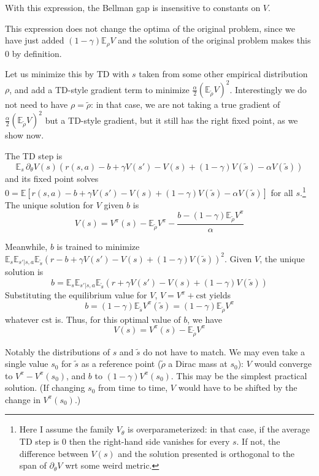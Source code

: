 \documentclass[11pt]{article}
\newcommand{\E}{\mathbb{E}}
\begin{document}
With this expression, the Bellman gap is insensitive to constants on $V$.

This expression does not change the optima of the original
problem, since we have just added $(1-\gamma)\E_\rho V$ and the solution
of the original problem makes this $0$ by definition.

Let us minimize this by TD with $s$ taken from some other empirical
distribution $\rho$, and add a TD-style gradient term to minimize
$\frac{\alpha}{2} (\E_{\tilde \rho} V)^2$. Interestingly we do not need
to have $\rho=\tilde \rho$: in that case, we are not taking a true
gradient of $\frac{\alpha}{2} (\E_{\tilde \rho} V)^2$ but a TD-style
gradient, but it still has the right fixed point, as we show now.

The TD step is
\begin{equation}
\E_s \,\partial_\theta V(s)\left(
r(s,a)-b+\gamma V(s')-V(s)+(1-\gamma)V(\tilde s)-\alpha V(\tilde s)
\right)
\end{equation}
and its fixed point solves $0=\E[r(s,a)-b+\gamma V(s')-V(s)+(1-\gamma)V(\tilde
s)-\alpha V(\tilde s)]$ for all $s$.\footnote{Here I assume the family
$V_\theta$ is
overparameterized: in that case, if the average TD step is $0$ then the
right-hand side vanishes for every $s$. If not, the difference between $V(s)$ and the solution
presented is orthogonal to the span of $\partial_\theta V$ wrt some weird
metric.} The unique solution for $V$ given $b$ is
\begin{equation}
V(s)=V^\pi(s)-\E_{\tilde \rho} V^\pi-\frac{b-(1-\gamma)\E_{\tilde \rho} V^\pi}{\alpha}
\end{equation}

Meanwhile, $b$ is trained to minimize $\E_s\E_{s'|s,a}\E_{\tilde s} (r-b+\gamma
V(s')-V(s)+(1-\gamma)V(\tilde s))^2$. Given $V$, the unique solution is
\begin{equation}
b=\E_s\E_{s'|s,a}\E_{\tilde s}(r+\gamma
V(s')-V(s)+(1-\gamma)V(\tilde s))
\end{equation}
Substituting the equilibrium value for $V$, $V=V^\pi+\mathrm{cst}$ yields
\begin{equation}
b=(1-\gamma)\E_{\tilde s} V^\pi(\tilde s)=(1-\gamma)\E_{\tilde \rho} V^\pi
\end{equation}
whatever $\mathrm{cst}$ is. Thus, for this optimal value of $b$, we have
\begin{equation}
V(s)=V^\pi(s)-\E_{\tilde \rho} V^\pi
\end{equation}

Notably the distributions of $s$ and $\tilde s$ do not have to match. We may even take a single value $s_0$ for $\tilde s$ as a reference point
($\tilde \rho$ a Dirac mass at $s_0$): $V$ would converge to
$V^\pi-V^\pi(s_0)$, and $b$ to $(1-\gamma)V^\pi(s_0)$. This may be the
simplest practical solution. (If changing $s_0$ from time to time, $V$
would have to be shifted by the change in $V^\pi(s_0)$.)
\end{document}
